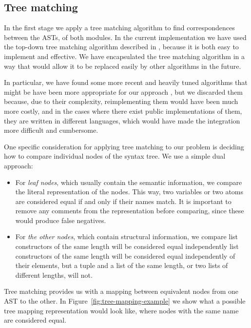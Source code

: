 \subsection{Tree matching\label{sub:tree-matching}}

In the first stage we apply a tree matching algorithm to find correspondences
between the ASTs, of both modules. In the current implementation we
have used the top-down tree matching algorithm described in \cite{al2005diffx},
because it is both easy to implement and effective. We have encapsulated
the tree matching algorithm in a way that would allow it to be replaced
easily by other algorithms in the future.

In particular, we have found some more recent and heavily tuned algorithms
that might be have been more appropriate for our approach
\cite{falleri2014fine,fluri2007change}, but we
discarded them because, due to their complexity, reimplementing them would
have been much more costly, and in the cases where there exist public
implementations of them, they are written in different languages, which
would have made the integration more difficult and cumbersome.

One specific consideration for applying tree matching to our problem is
deciding how to compare individual nodes of the syntax tree. We use
a simple dual approach:
\begin{itemize}
\item For \emph{leaf nodes}, which usually contain the semantic information, we
compare the literal representation of the nodes. This way, two variables
or two atoms are considered equal if and only if their names match.
It is important to remove any comments from the representation before
comparing, since these would produce false negatives.
\item For \emph{the other nodes}, which contain structural information, we 
compare
list constructors of the same length will be considered equal independently
list constructors of the same length will be considered equal independently
of their elements, but a tuple and a list of the same length, or two
lists of different lengths, will not.
\end{itemize}
Tree matching provides us with a mapping between equivalent nodes
from one AST to the other. In Figure~\ref{fig:tree-mapping-example}
we show what a possible tree mapping representation would look like,
where nodes with the same name are considered equal.

